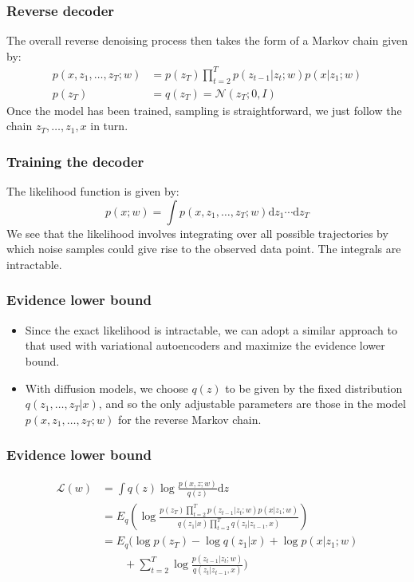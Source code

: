 \documentclass{beamer}
\begin{document}
\begin{frame}
    \frametitle{Reverse decoder}
    The overall reverse denoising process then takes the form of a Markov chain given by:
    \begin{align*}
        p(x,z_{1},\hdots,z_{T};w)&=p(z_{T})\prod_{t=2}^{T}p(z_{t-1}|z_{t};w)p(x|z_{1};w) \\
        p(z_{T})&=q(z_{T})=\mathcal{N}(z_{T};0,I)
    \end{align*}
    Once the model has been trained, sampling is straightforward, we just follow the chain $z_{T},\hdots,z_{1},x$ in turn.
\end{frame}

\begin{frame}
    \frametitle{Training the decoder}
    The likelihood function is given by:
    \begin{equation*}
        p(x;w)=\int{}p(x,z_{1},\hdots,z_{T};w)\mathrm{d}z_{1}\cdots\mathrm{d}z_{T}
    \end{equation*}
    We see that the likelihood involves integrating over all possible trajectories by which noise samples could give rise to the observed data point. The integrals are intractable.
\end{frame}

\begin{frame}
    \frametitle{Evidence lower bound}
    \begin{itemize}
        \item Since the exact likelihood is intractable, we can adopt a similar approach to that used with variational autoencoders and maximize the evidence lower bound.
        \item With diffusion models, we choose $q(z)$ to be given by the fixed distribution $q(z_{1},\hdots,z_{T}|x)$, and so the only adjustable parameters are those in the model $p(x,z_{1},\hdots,z_{T};w)$ for the reverse Markov chain.
    \end{itemize}
\end{frame}

\begin{frame}
    \frametitle{Evidence lower bound}
    \begin{align*}
        \mathcal{L}(w)&=\int{}q(z)\log\frac{p(x,z;w)}{q(z)}\mathrm{d}z \\
        &=E_{q}(\log\frac{p(z_{T})\prod_{t=2}^{T}p(z_{t-1}|z_{t};w)p(x|z_{1};w)}{q(z_{1}|x)\prod_{t=2}^{T}q(z_{t}|z_{t-1},x)}) \\
        &=E_{q}(\log{}p(z_{T})-\log{}q(z_{1}|x)+\log{}p(x|z_{1};w) \\
        &\qquad+\sum_{t=2}^{T}\log\frac{p(z_{t-1}|z_{t};w)}{q(z_{t}|z_{t-1},x)})
    \end{align*}
\end{frame}
\end{document}
